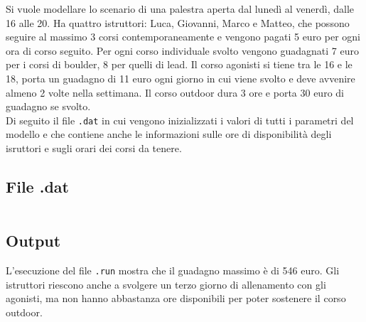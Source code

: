 Si vuole modellare lo scenario di una palestra aperta dal lunedì al venerdì, dalle 16 alle 20. Ha quattro istruttori: Luca, Giovanni, Marco e Matteo, che possono seguire al massimo 3 corsi contemporaneamente e vengono pagati 5 euro per ogni ora di corso seguito. Per ogni corso individuale svolto vengono guadagnati 7 euro per i corsi di boulder, 8 per quelli di lead. Il corso agonisti si tiene tra le 16 e le 18, porta un guadagno di 11 euro ogni giorno in cui viene svolto e deve avvenire almeno 2 volte nella settimana. Il corso outdoor dura 3 ore e porta 30 euro di guadagno se svolto. \\
Di seguito il file \texttt{.dat} in cui vengono inizializzati i valori di tutti i parametri del modello e che contiene anche le informazioni sulle ore di disponibilità degli isruttori e sugli orari dei corsi da tenere.

\subsection{File .dat}
\inputminted[bgcolor=bg, breaklines, fontsize=\small]{haskell}{ampl/scenario-1.dat}

\subsection{Output}
L'esecuzione del file \texttt{.run} mostra che il guadagno massimo è di 546 euro. Gli istruttori riescono anche a svolgere un terzo giorno di allenamento con gli agonisti, ma non hanno abbastanza ore disponibili per poter sostenere il corso outdoor.
